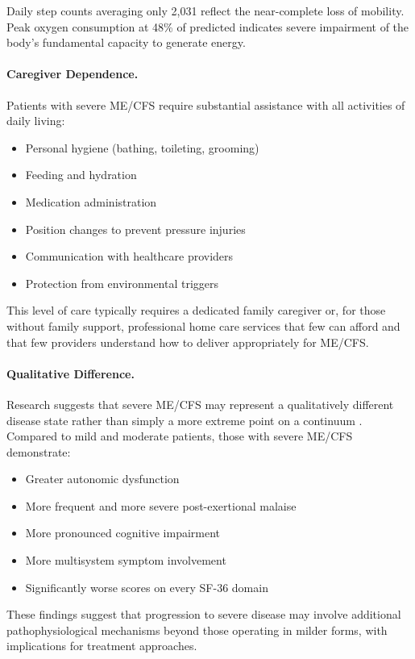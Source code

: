 Daily step counts averaging only 2,031 reflect the near-complete loss of mobility. Peak oxygen consumption at 48\% of predicted indicates severe impairment of the body's fundamental capacity to generate energy.

\paragraph{Caregiver Dependence.}
Patients with severe ME/CFS require substantial assistance with all activities of daily living:
\begin{itemize}
    \item Personal hygiene (bathing, toileting, grooming)
    \item Feeding and hydration
    \item Medication administration
    \item Position changes to prevent pressure injuries
    \item Communication with healthcare providers
    \item Protection from environmental triggers
\end{itemize}

This level of care typically requires a dedicated family caregiver or, for those without family support, professional home care services that few can afford and that few providers understand how to deliver appropriately for ME/CFS.

\paragraph{Qualitative Difference.}
Research suggests that severe ME/CFS may represent a qualitatively different disease state rather than simply a more extreme point on a continuum \cite{Kingdon2020severe}. Compared to mild and moderate patients, those with severe ME/CFS demonstrate:
\begin{itemize}
    \item Greater autonomic dysfunction
    \item More frequent and more severe post-exertional malaise
    \item More pronounced cognitive impairment
    \item More multisystem symptom involvement
    \item Significantly worse scores on every SF-36 domain
\end{itemize}

These findings suggest that progression to severe disease may involve additional pathophysiological mechanisms beyond those operating in milder forms, with implications for treatment approaches.

